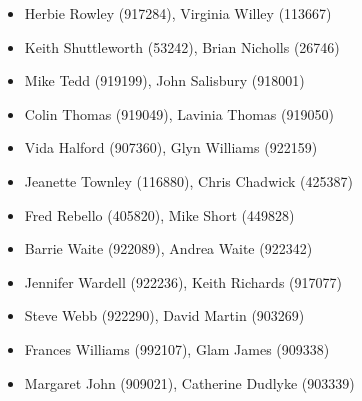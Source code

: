 \documentclass[11pt]{article}
\begin{document}
\begin{multicols}{2}
\begin{itemize}
\item Herbie Rowley (917284),
Virginia Willey (113667)
\item Keith Shuttleworth (53242),
Brian Nicholls (26746)
\item Mike Tedd (919199),
John Salisbury (918001)
\item Colin Thomas (919049),
Lavinia Thomas (919050)
\item Vida Halford (907360),
Glyn Williams (922159)
\item Jeanette Townley (116880),
Chris Chadwick (425387)
\item Fred Rebello (405820),
Mike Short (449828)
\item Barrie Waite (922089),
Andrea Waite (922342)
\item Jennifer Wardell (922236),
Keith Richards (917077)
\item Steve Webb (922290),
David Martin (903269)
\item Frances Williams (992107),
Glam James (909338)
\item Margaret John (909021),
Catherine Dudlyke (903339)
\end{itemize}

\end{multicols}

\newpage
\end{document}
